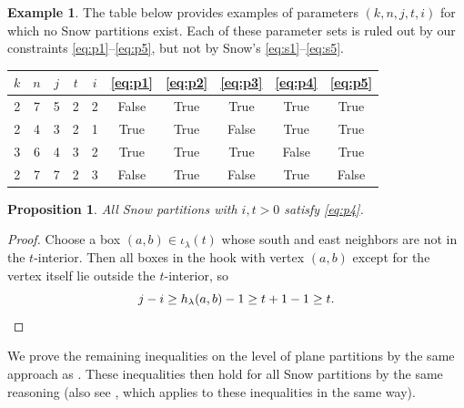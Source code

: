 \documentclass{amsart}
\theoremstyle{plain}
\newtheorem{proposition}[proposition]{Proposition}
\theoremstyle{definition}
\newtheorem{example}[example]{Example}
\numberwithin{equation}{section}
\begin{document}
\begin{example}The table below provides examples of parameters $(k,n,j,t,i)$ for which no Snow partitions exist. Each of these parameter sets is ruled out by our constraints \ref{eq:p1}--\ref{eq:p5}, but not by Snow's \ref{eq:s1}--\ref{eq:s5}.

\begin{center}
\begin{tabular}{|c c c c c| c c c c c|}
    \hline
    $k$ & $n$ & $j$ & $t$ & $i$ & \ref{eq:p1} & \ref{eq:p2} & \ref{eq:p3} & \ref{eq:p4} & \ref{eq:p5}\\
    \hline
    2&7&5&2&2 &False&True&True&True&True\\
    2&4&3&2&1 & True & True & False & True & True\\
    3&6&4&3&2 & True & True & True & False & True\\
    2&7&7&2&3 & False & True & False & True & False\\
    \hline
\end{tabular}
\end{center}
\end{example}

\begin{proposition}All Snow partitions with $i,t>0$ satisfy \emph{\ref{eq:p4}}.\end{proposition}
\begin{proof}
Choose a box $(a,b)\in\iota_\lambda(t)$ whose south and east neighbors are not in the $t$-interior. Then all boxes in the hook with vertex $(a,b)$ except for the vertex itself lie outside the $t$-interior, so
\[j-i\geq h_\lambda(a,b)-1\geq t+1-1\geq t.\qedhere\]
\end{proof}

We prove the remaining inequalities on the level of plane partitions by the same approach as . These inequalities then hold for all Snow partitions by the same reasoning (also see , which applies to these inequalities in the same way).
\end{document}
